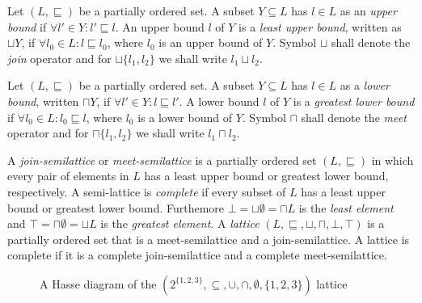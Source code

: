 \begin{defn}
Let $(L, \sqsubseteq)$ be a partially ordered set. A subset $Y \subseteq L$ has $l \in L$ as an \emph{upper bound} if $\forall l' \in Y: l' \sqsubseteq l$. An upper bound $l$ of $Y$ is a \emph{least upper bound}, written as $\sqcup Y$, if $\forall l_0 \in L: l \sqsubseteq l_0$, where $l_0$ is an upper bound of $Y$. Symbol $\sqcup$ shall denote the \emph{join} operator and for $\sqcup\{l_1, l_2\}$ we shall write $l_1 \sqcup l_2$.
\end{defn}

\begin{defn}
Let $(L, \sqsubseteq)$ be a partially ordered set. A subset $Y \subseteq L$ has $l \in L$ as a \emph{lower bound}, written $\sqcap Y$, if $\forall l' \in Y: l \sqsubseteq l'$. A lower bound $l$ of $Y$ is a \emph{greatest lower bound} if $\forall l_0 \in L: l_0 \sqsubseteq l$, where $l_0$ is a lower bound of $Y$. Symbol $\sqcap$ shall denote the \emph{meet} operator and for $\sqcap\{l_1, l_2\}$ we shall write $l_1 \sqcap l_2$.
\end{defn}

\begin{defn}
A \emph{join-semilattice} or \emph{meet-semilattice} is a partially ordered set $(L, \sqsubseteq)$ in which every pair of elements in $L$ has a least upper bound or greatest lower bound, respectively. A semi-lattice is \emph{complete} if every subset of $L$ has a least upper bound or greatest lower bound. Furthemore $\bot = \sqcup \emptyset = \sqcap L$ is the \emph{least element} and $\top = \sqcap \emptyset = \sqcup L$ is the \emph{greatest element}. A \emph{lattice} $(L, \sqsubseteq, \sqcup, \sqcap, \bot, \top)$ is a partially ordered set that is a meet-semilattice and a join-semilattice. A lattice is complete if it is a complete join-semilattice and a complete meet-semilattice.
\end{defn}

\begin{figure}[H]
    \centering
    \caption{A Hasse diagram of the $(2^{\{1,2,3\}}, \subseteq, \cup, \cap, \emptyset, \{1,2,3\})$ lattice}
    \label{fig_absintr_intervals}
\end{figure}

